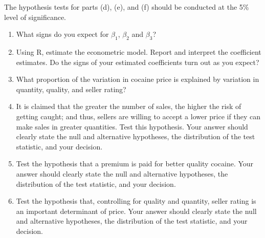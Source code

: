 \documentclass[12pt,a4paper]{article}
\begin{document}
\noindent The hypothesis tests for parts (d), (e), and  (f) should be conducted at the 5\% level of significance.
\begin{enumerate}
\item What signs do you expect for $\beta_{1}$, $\beta_{2}$ and
$\beta_{3}$?
\item Using \textsc{R}, estimate the econometric model. Report
and interpret the coefficient estimates. Do the signs of your
estimated coefficients turn out as you expect?

\item What proportion of the variation in cocaine price is explained
by variation in quantity, quality, and seller rating?

\item It is claimed that the greater the number of sales, the higher
the risk of getting caught; and thus, sellers are willing to accept
a lower price if they can make sales in greater quantities. Test
this hypothesis. Your answer should clearly state the null and
alternative hypotheses, the distribution of the test statistic, and
your decision.

\item Test the hypothesis that a premium is paid
for better quality cocaine. Your answer should clearly state the
null and alternative hypotheses, the distribution of the test
statistic, and your decision.

\item Test the hypothesis that, controlling for quality and quantity, seller rating is an important
determinant of price. Your answer should clearly state the
null and alternative hypotheses, the distribution of the test
statistic, and your decision.
\end{enumerate}
\end{document}
